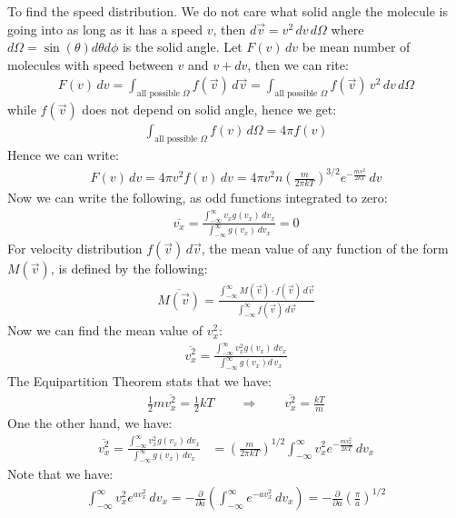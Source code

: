 \documentclass[11pt,oneside]{book}
\theoremstyle{break}
\theoremstyle{break}
\begin{document}
To find the speed distribution. We do not care what solid angle the molecule is going into as long as it has a speed $v$, then $d\vec{v} = v^2 \, dv\, d\Omega$ where $d\Omega = \sin(\theta)d\theta d\phi$ is the solid angle. Let $F(v) \, dv$ be mean number of molecules with speed between $v$ and $v+dv$, then we can rite:
\begin{align*}
F(v)\, dv = \int_{\text{all possible }\Omega} f(\vec{v})\, d\vec{v} = \int_{\text{all possible }\Omega} f(\vec{v})\,v^2 \, dv\, d\Omega
\end{align*}
while $f(\vec{v})$ does not depend on solid angle, hence we get:
\begin{align*}
\int_{\text{all possible }\Omega} f(v)\, d\Omega = 4\pi f(v)
\end{align*} 
Hence we can write:
\begin{align*}
F(v)\, dv = 4\pi v^2 f(v)\, dv = 4\pi v^2 n\left(\frac{m}{2\pi kT}\right)^{3/2} e^{-\frac{mv^2}{2kT}}\, dv
\end{align*}
Now we can write the following, as odd functions integrated to zero:
\begin{align*}
\overline{v_x} = \frac{\int_{-\infty}^{\infty} v_x g(v_x)\, dv_x}{\int_{-\infty}^{\infty} g(v_x) \, dv_x}=0
\end{align*}
For velocity distribution $f(\vec{v})\, d\vec{v}$, the mean value of any function of the form $M(\vec{v})$, is defined by the following:
\begin{align*}
\overline{M(\vec{v})} = \frac{\int_{-\infty}^{\infty} M(\vec{v})\cdot f(\vec{v})\, d\vec{v}}{\int_{-\infty}^{\infty} f(\vec{v})\, d\vec{v}}
\end{align*}
Now we can find the mean value of $v_x^2$:
\begin{align*}
\overline{v_x^2} = \frac{\int_{-\infty}^{\infty} v_x^2 g(v_x)\, dv_x}{\int_{-\infty}^{\infty} g(v_x) d\, v_x}
\end{align*}
The Equipartition Theorem stats that we have:
\begin{align*}
\frac{1}{2}m\overline{v_x^2} = \frac{1}{2}kT \qquad \Rightarrow \qquad \overline{v_x^2 }= \frac{kT}{m}
\end{align*}
One the other hand, we have:
\begin{align*}
\overline{v_x^2} = \frac{\int_{-\infty}^{\infty} v_x^2 g(v_x)\, dv_x}{\int_{-\infty}^{\infty} g(v_x)\, d v_x} &= \left(\frac{m}{2\pi kT}\right)^{1/2} \int_{-\infty}^{\infty} v_x^2 e^{-\frac{mv_x^2}{2kT}}\, dv_x
\end{align*}
Note that we have:
\begin{align*}
\int_{-\infty}^{\infty} v_x^2 e^{av_x^2}\, dv_x = -\frac{\partial }{\partial a}\left(\int_{-\infty}^{\infty} e^{-av_x^2}\, dv_x\right) = -\frac{\partial }{\partial a}\left(\frac{\pi}{a}\right)^{1/2}
\end{align*}
\end{document}
